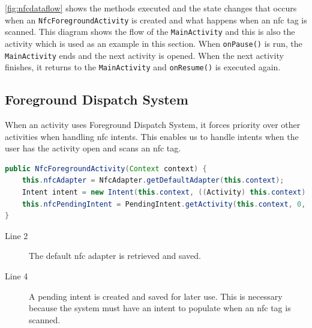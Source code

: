 \autoref{fig:nfcdataflow} shows the methods executed and the state changes that occurs when an \lstinline|NfcForegroundActivity| is created and what happens when an \ac{nfc} tag is scanned. This diagram shows the flow of the \lstinline|MainActivity| and this is also the activity which is used as an example in this section. When \lstinline|onPause()| is run, the \lstinline|MainActivity| ends and the next activity is opened. When the next activity finishes, it returns to the \lstinline|MainActivity| and \lstinline|onResume()| is executed again.

\subsection*{Foreground Dispatch System}
\label{sec:foreground}

When an activity uses Foreground Dispatch System, it forces priority over other activities when handling \ac{nfc} intents\citep{foregroundDispatch}. This enables us to handle intents when the user has the activity open and scans an \ac{nfc} tag.

\begin{lstlisting}[language=java, label=nfcForegroundOnCreate, caption={Initializing the pending intent}]
public NfcForegroundActivity(Context context) { 
    this.nfcAdapter = NfcAdapter.getDefaultAdapter(this.context);
    Intent intent = new Intent(this.context, ((Activity) this.context).getClass());
    this.nfcPendingIntent = PendingIntent.getActivity(this.context, 0, intent ,0);
}
\end{lstlisting}
\begin{description}
\item[Line 2] The default \ac{nfc} adapter is retrieved and saved.
\item[Line 4] A pending intent is created and saved for later use. This is necessary because the system must have an intent to populate when an \ac{nfc} tag is scanned.
\end{description}

